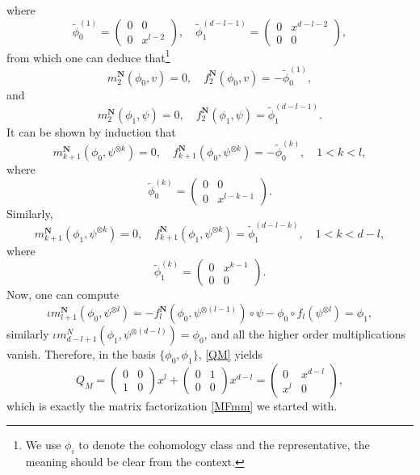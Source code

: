 \documentclass[a4paper,11pt]{article}
\numberwithin{equation}{section}
\begin{document}
where
\[
\tilde{\phi}^{(1)}_0 = \left( \begin{array}{cc} 0 & 0 \\ 0 & x^{l-2} 
\end{array} 
\right), \quad
\tilde{\phi}^{(d-l-1)}_1 = \left( \begin{array}{cc} 0 & x^{d-l-2} \\ 0 & 0 
\end{array} \right),
\]
from which one can deduce that\footnote{We use $\phi_i$ to denote the 
cohomology 
class and the representative, the meaning should be clear from the context.}
\[
m^\mathbf{N}_2(\phi_0,v) = 0, \quad f^\mathbf{N}_2(\phi_0,v) = 
-\tilde{\phi}^{(1)}_0,
\]
and
\[
m^\mathbf{N}_2(\phi_1,\psi) = 0, \quad f^\mathbf{N}_2(\phi_1,\psi) = 
\tilde{\phi}^{(d-l-1)}_1.
\]
It can be shown by induction that
\[
m^\mathbf{N}_{k+1}(\phi_0,\psi^{\otimes k}) = 0, \quad 
f^\mathbf{N}_{k+1}(\phi_0,\psi^{\otimes k}) = 
-\tilde{\phi}^{(k)}_0,\quad 1<k<l,
\]
where
\[
\tilde{\phi}^{(k)}_0 = \left( \begin{array}{cc} 0 & 0 \\ 0 & x^{l-k-1} 
\end{array} \right).
\]
Similarly,
\[
m^\mathbf{N}_{k+1}(\phi_1,\psi^{\otimes k}) = 0, \quad 
f^\mathbf{N}_{k+1}(\phi_1,\psi^{\otimes k}) = 
\tilde{\phi}^{(d-l-k)}_1,\quad 1<k<d-l,
\]
where
\[
\tilde{\phi}^{(k)}_1 = \left( \begin{array}{cc} 0 & x^{k-1} \\ 0 & 0 
\end{array} 
\right).
\]
Now, one can compute
\[
\iota m^\mathbf{N}_{l+1}(\phi_0,\psi^{\otimes l}) = 
-f^\mathbf{N}_l(\phi_0,\psi^{\otimes (l-1)}) \circ 
\psi - \phi_0 \circ f_l(\psi^{\otimes l}) = \phi_1,
\]
similarly $\iota m^N_{d-l+1}(\phi_1,\psi^{\otimes (d-l)}) = \phi_0$,
and all the higher order multiplications vanish. Therefore, in the basis 
$\{\phi_0,\phi_1\}$, \eqref{QM} yields
\[
Q_M = \left( \begin{array}{cc} 0 & 0 \\ 1 & 0 \end{array} \right) x^l + \left( 
\begin{array}{cc} 0 & 1 \\ 0 & 0 \end{array} \right) x^{d-l} = \left( 
\begin{array}{cc} 0 & x^{d-l} \\ x^l & 0 \end{array} \right),
\]
which is exactly the matrix factorization \eqref{MFmm} we started with.
\end{document}
